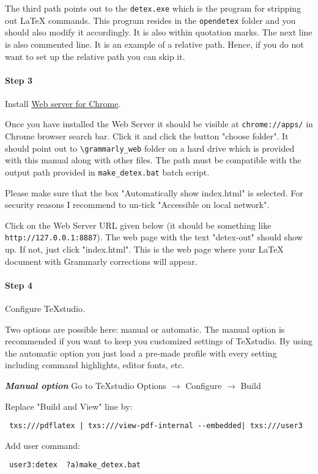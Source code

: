 \documentclass[]{spie}  %
\begin{document}
The third path points out to the \verb|detex.exe| which is the program for stripping out LaTeX commands. This program resides in the \verb|opendetex| folder and you should also modify it accordingly. It is also within quotation marks.
The next line is also commented line. 
It is an example of a relative path. Hence, if you do not want to set up the relative path you can skip it.

\paragraph{Step 3} Install \href{https://chrome.google.com/webstore/detail/web-server-for-chrome/ofhbbkphhbklhfoeikjpcbhemlocgigb}{Web server for Chrome}. 

Once you have installed the Web Server it should be visible at \verb|chrome://apps/| in Chrome browser search bar. Click it and click the button "choose folder". It should point out to \verb|\grammarly_web| folder on a hard drive which is provided with this manual along with other files. 
The path must be compatible with the output path provided in \verb|make_detex.bat| batch script. 

Please make sure that the box "Automatically show index.html" is selected. 
For security reasons I recommend to un-tick "Accessible on local network".  

Click on the Web Server URL given below (it should be something like \verb|http://127.0.0.1:8887|). 
The web page with the text "detex-out" should show up. 
If not, just click "index.html".
This is the web page where your LaTeX document with Grammarly corrections will appear.

\paragraph{Step 4} Configure TeXstudio.

Two options are possible here: manual or automatic. 
The manual option is recommended if you want to keep you customized settings of TeXstudio. By using the automatic option you just load a pre-made profile with every setting including command highlights, editor fonts, etc.

\clearpage
\noindent \textbf{\textit{Manual option}}
Go to TeXstudio Options \(\rightarrow\) Configure \(\rightarrow\)  Build

Replace "Build and View" line by:
\begin{verbatim}
 txs:///pdflatex | txs:///view-pdf-internal --embedded| txs:///user3
 \end{verbatim}
 Add user command:
 \begin{verbatim}
 user3:detex  ?a)make_detex.bat
 \end{verbatim}
 
\end{document}

